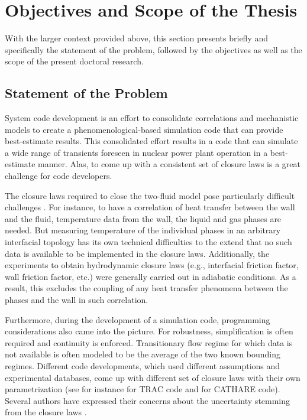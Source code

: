 \section{Objectives and Scope of the Thesis}\label{sec:intro_objectives_and_scope}

With the larger context provided above,
this section presents briefly and specifically the statement of the problem,
followed by the objectives as well as the scope of the present doctoral research.

\subsection{Statement of the Problem}\label{sub:intro_statement_of_problem}

System code development is an effort to consolidate correlations and mechanistic models to create a phenomenological-based simulation code that can provide best-estimate results.
This consolidated effort results in a code that can simulate a wide range of transients foreseen in nuclear power plant operation in a best-estimate manner.
Alas, to come up with a consistent set of closure laws is a great challenge for code developers.

The closure laws required to close the two-fluid model pose particularly difficult challenges \cite{Wulff2007}.
For instance, to have a correlation of heat transfer between the wall and the fluid, temperature data from the wall, the liquid and gas phases are needed.
But measuring temperature of the individual phases in an arbitrary interfacial topology has its own technical difficulties to the extend that no such data is available to be implemented in the closure laws.
Additionally, the experiments to obtain hydrodynamic closure laws (e.g., interfacial friction factor, wall friction factor, etc.) were generally carried out in adiabatic conditions.
As a result, this excludes the coupling of any heat transfer phenomena between the phases and the wall in such correlation.

Furthermore, during the development of a simulation code, programming considerations also came into the picture.
For robustness, simplification is often required and continuity is enforced.
Transitionary flow regime for which data is not available is often modeled to be the average of the two known bounding regimes.
Different code developments, which used different assumptions and experimental databases, come up with different set of closure laws with their own parametrization (see for instance \cite{Nelson1992} for TRAC code and \cite{Bestion1990} for CATHARE code).
Several authors have expressed their concerns about the uncertainty stemming from the closure laws \cite{Wulff2007,Petruzzi2008a,DAuria2012}.


